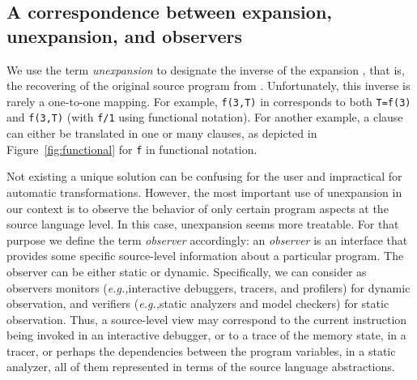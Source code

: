 \documentclass[preprint]{llncs}
\newcommand{\eg}{\emph{e.g.,\xspace}}
\begin{document}
\subsection{A correspondence between expansion, unexpansion, and observers}

We use the term \emph{unexpansion} to designate the inverse of the
expansion , that is, the recovering of the original
 source program
from . Unfortunately, this inverse is rarely a one-to-one mapping.
For example, \verb|f(3,T)| in  corresponds to both
\verb|T=f(3)| and \verb|f(3,T)| (with \verb|f/1| using functional
notation). For another example, a clause can either be translated
in one or many clauses, as depicted in Figure~\ref{fig:functional} 
for  \verb|f| in functional notation.

Not existing a unique solution can be confusing for the
user and impractical for automatic transformations.
However, the most important use of unexpansion in our context is to
observe the behavior of only certain program aspects at the source
language level. In this case, unexpansion seems more treatable. For
that purpose we define the term \emph{observer} accordingly:
an \emph{observer} is an interface that provides some specific
source-level information about a particular program. The observer can
be either static or dynamic. Specifically, we can consider as
observers monitors (\eg interactive debuggers, tracers, and profilers)
for dynamic observation, and verifiers (\eg static analyzers and model
checkers) for static observation. Thus, a source-level view may
correspond to the current instruction being invoked in an interactive
debugger, or to a trace of the memory state, in a tracer, or perhaps
the dependencies between the program variables, in a static analyzer,
all of them represented in terms of the source language abstractions.
\end{document}
